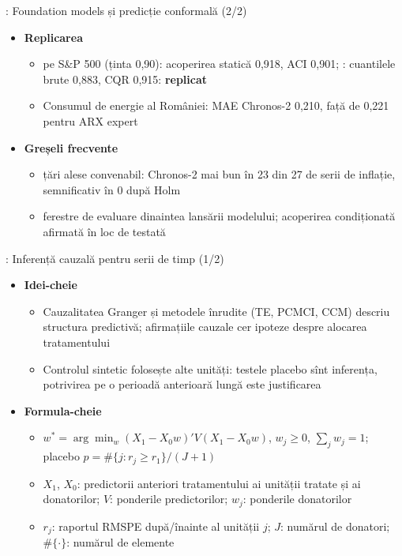 \begin{frame}{: Foundation models și predicție conformală (2/2)}
\itemsize{\small}
\begin{itemize}
    \item \textbf{Replicarea}
    \begin{itemize}
        \item {} pe S\&P 500 (ținta 0,90): acoperirea statică 0{,}918, ACI 0{,}901; : cuantilele brute 0{,}883, CQR 0{,}915: \textbf{replicat}
        \item Consumul de energie al României: MAE Chronos-2 0{,}210, față de 0{,}221 pentru ARX expert
    \end{itemize}
    \item \textbf{Greșeli frecvente}
    \begin{itemize}
        \item țări alese convenabil: Chronos-2 mai bun în 23 din 27 de serii de inflație, semnificativ în 0 după Holm
        \item ferestre de evaluare dinaintea lansării modelului; acoperirea condiționată afirmată în loc de testată
    \end{itemize}
\end{itemize}
\end{frame}

\begin{frame}{: Inferență cauzală pentru serii de timp (1/2)}
\itemsize{\footnotesize}
\begin{itemize}
    \item \textbf{Idei-cheie}
    \begin{itemize}
        \item Cauzalitatea Granger și metodele înrudite (TE, PCMCI, CCM) descriu structura predictivă; afirmațiile cauzale cer ipoteze despre alocarea tratamentului
        \item Controlul sintetic folosește alte unități: testele placebo sînt inferența, potrivirea pe o perioadă anterioară lungă este justificarea
    \end{itemize}
    \item \textbf{Formula-cheie}
    \begin{itemize}
        \item $w^* = \arg\min_w(X_1 - X_0w)'V(X_1 - X_0w)$, $w_j \ge 0$, $\sum_jw_j = 1$; placebo $p = \#\{j: r_j \ge r_1\}/(J + 1)$
        \item $X_1$, $X_0$: predictorii anteriori tratamentului ai unității tratate și ai donatorilor; $V$: ponderile predictorilor; $w_j$: ponderile donatorilor
        \item $r_j$: raportul RMSPE după/înainte al unității $j$; $J$: numărul de donatori; $\#\{\cdot\}$: numărul de elemente
    \end{itemize}
\end{itemize}
\end{frame}


